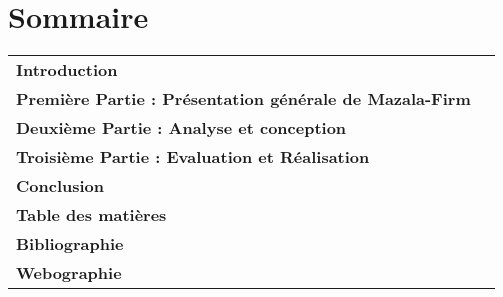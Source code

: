 \documentclass[12pt,french]{extreport}
\begin{document}







\listoffigures
{}
\listoftables
{}

\chapter*{Sommaire}
\noindent\begin{tabularx}{\textwidth}{Xr}
  \textbf{Introduction} \dotfill \pageref{chap:introduction} \\

  \textbf{Première Partie : Présentation générale de Mazala-Firm} \dotfill \pageref{part:presentation} \\

  \textbf{Deuxième Partie : Analyse et conception} \dotfill \pageref{part:analyse-et-conception} \\

  \textbf{Troisième Partie : Evaluation et Réalisation} \dotfill \pageref{part:evaluation-et-realisation} \\

  \textbf{Conclusion} \dotfill \pageref{chap:conclusion} \\

  \textbf{Table des matières} \dotfill \pageref{sec:tableofcontents} \\

  \textbf{Bibliographie} \dotfill \pageref{sec:bibliographie} \\

  \textbf{Webographie} \dotfill \pageref{sec:webographie} \\
\end{tabularx}






\newpage









\end{document}
